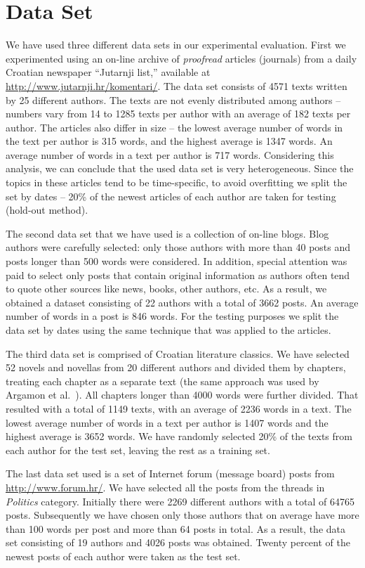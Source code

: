 \documentclass{llncs}
\begin{document}
\section{Data Set}
\label{sec:podatci}
We have used three different data sets in our experimental evaluation. First we
experimented using an on-line archive of \emph{proofread} articles (journals)
from a daily Croatian newspaper ``Jutarnji list,'' available at
\small \url{http://www.jutarnji.hr/komentari/}\normalsize.  The data set consists of 4571 texts
written by 25 different authors. The texts are not evenly distributed among
authors -- numbers vary from 14 to 1285 texts per author with an average of 182
texts per author. The articles also differ in size -- the lowest average number
of words in the text per author is 315 words, and the highest average is 1347
words. An average number of words in a text per author is 717 words. Considering
this analysis, we can conclude that the used data set is very heterogeneous.
Since the topics in these articles tend to be time-specific, to avoid
overfitting we split the set by dates -- 20\% of the newest articles of each
author are taken for testing (hold-out method).

The second data set that we have used is a collection of on-line blogs. Blog authors were
carefully selected: only those authors with more than 40 posts
and posts longer than 500 words were considered. In addition, special attention
was paid to select only posts that contain original information as authors often tend to
quote other sources like news, books, other authors, etc. As a result, we obtained a dataset
consisting of 22 authors with a total of 3662 posts. An
average number of words in a post is 846 words. For the testing purposes we
split the data set by dates using the same technique that was applied to the
articles.

The third data set is comprised of Croatian literature classics. We have
selected 52 novels and novellas from 20 different authors and divided them by
chapters, treating each chapter as a separate text (the same approach was used by
Argamon et al.\ \cite{argamon2005measuring}). All chapters longer than 4000 words
were further divided. That resulted with a total of 1149 texts, with an average
of 2236 words in a text. The lowest average number of words in a text per
author is 1407 words and the highest average is 3652 words. We have randomly 
selected 20\% of the texts from each author for the test set, leaving the rest as
a training set.

The last data set used is a set of Internet forum (message board)
posts from \small \url{http://www.forum.hr/}\normalsize. We have selected all the posts from the threads in
\textit{Politics} category. Initially there were 2269 different authors with a
total of 64765 posts. Subsequently we have chosen only those authors that on
average have more than 100 words per post and more than 64 posts in total. As a
result, the data set consisting of 19 authors and 4026 posts was obtained. Twenty
percent of the newest posts of each author were taken as the test set.
\end{document}
